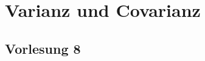 

\chapter{Varianz und Covarianz}\label{ch:varianz-und-covarianz}


\section{Vorlesung 8}\label{sec:vorlesung-8}
